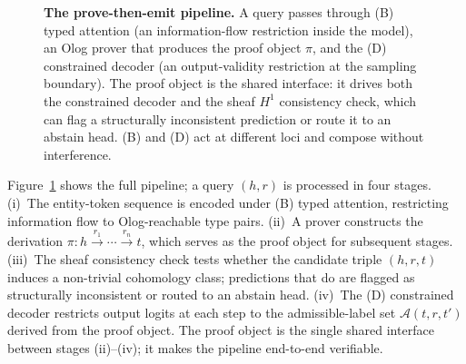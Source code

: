 \begin{figure}[t]
\centering
{}
\caption{\textbf{The prove-then-emit pipeline.} A query passes through
(B) typed attention (an information-flow restriction inside the model),
an Olog prover that produces the proof object $\pi$, and the (D)
constrained decoder (an output-validity restriction at the sampling
boundary). The proof object is the shared interface: it drives both the
constrained decoder and the sheaf $H^1$ consistency check, which can
flag a structurally inconsistent prediction or route it to an abstain
head. (B) and (D) act at different loci and compose without
interference.}
\label{fig:pipeline}
\end{figure}

Figure~\ref{fig:pipeline} shows the full pipeline; a query $(h, r)$ is
processed in four stages.
(i)~The entity-token sequence is encoded under (B) typed attention, restricting information flow to Olog-reachable type pairs.
(ii)~A prover constructs the derivation $\pi: h \xrightarrow{r_1} \cdots \xrightarrow{r_n} t$, which serves as the proof object for subsequent stages.
(iii)~The sheaf consistency check tests whether the candidate triple $(h, r, t)$ induces a non-trivial cohomology class; predictions that do are flagged as structurally inconsistent or routed to an abstain head.
(iv)~The (D) constrained decoder restricts output logits at each step to the admissible-label set $\mathcal{A}(t, r, t')$ derived from the proof object.
The proof object is the single shared interface between stages (ii)--(iv); it makes the pipeline end-to-end verifiable.
